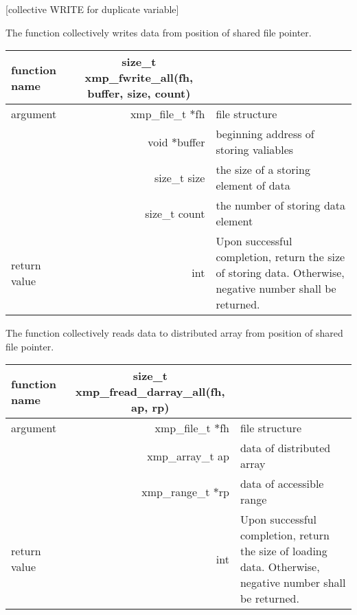    [collective WRITE for duplicate variable]

   The function collectively writes data from position of shared file
   pointer.

   \begin{table}[h]
    \begin{center}
     \begin{tabular}{l|r|p{70mm}}
      \hline
      {\bf function name}  & \multicolumn{1}{c}{\bf size\_t
      xmp\_fwrite\_all(fh, buffer, size, count)} &  \\ \hline
      argument & xmp\_file\_t $*$fh & file structure \\ \cline{2-3}
      & void $*$buffer & beginning address of storing valiables \\ \cline{2-3}
      & size\_t size & the size of a storing element of data \\ \cline{2-3}
      & size\_t count & the number of storing data element \\ \hline
      return value & int & Upon successful completion, return the size
	      of storing data. Otherwise, negative number shall be
	      returned. \\ \hline
      \end{tabular}
     \end{center}
    \label{tb:aaa}
   \end{table}


   The function collectively reads data to distributed array from
   position of shared file pointer.

   \begin{table}[h]
    \begin{center}
     \begin{tabular}{l|r|p{70mm}}
      \hline
      {\bf function name}  & \multicolumn{1}{c}{\bf size\_t
      xmp\_fread\_darray\_all(fh, ap, rp)} &  \\ \hline
      argument & xmp\_file\_t $*$fh & file structure \\ \cline{2-3}
      & xmp\_array\_t ap & data of distributed array \\ \cline{2-3}
      & xmp\_range\_t $*$rp & data of accessible range \\ \hline
      return value & int & Upon successful completion, return the size
	      of loading data. Otherwise, negative number shall be
	      returned. \\ \hline
      \end{tabular}
     \end{center}
    \label{tb:aaa}
   \end{table}

